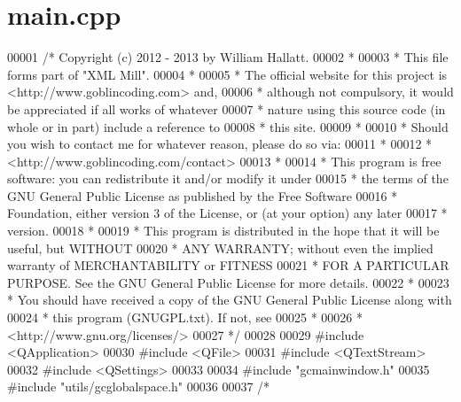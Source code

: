 \hypertarget{main_8cpp_source}{\section{main.\-cpp}
}

\begin{DoxyCode}
00001 \textcolor{comment}{/* Copyright (c) 2012 - 2013 by William Hallatt.}
00002 \textcolor{comment}{ *}
00003 \textcolor{comment}{ * This file forms part of "XML Mill".}
00004 \textcolor{comment}{ *}
00005 \textcolor{comment}{ * The official website for this project is <http://www.goblincoding.com> and,}
00006 \textcolor{comment}{ * although not compulsory, it would be appreciated if all works of whatever}
00007 \textcolor{comment}{ * nature using this source code (in whole or in part) include a reference to}
00008 \textcolor{comment}{ * this site.}
00009 \textcolor{comment}{ *}
00010 \textcolor{comment}{ * Should you wish to contact me for whatever reason, please do so via:}
00011 \textcolor{comment}{ *}
00012 \textcolor{comment}{ *                 <http://www.goblincoding.com/contact>}
00013 \textcolor{comment}{ *}
00014 \textcolor{comment}{ * This program is free software: you can redistribute it and/or modify it
       under}
00015 \textcolor{comment}{ * the terms of the GNU General Public License as published by the Free
       Software}
00016 \textcolor{comment}{ * Foundation, either version 3 of the License, or (at your option) any later}
00017 \textcolor{comment}{ * version.}
00018 \textcolor{comment}{ *}
00019 \textcolor{comment}{ * This program is distributed in the hope that it will be useful, but WITHOUT}
00020 \textcolor{comment}{ * ANY WARRANTY; without even the implied warranty of MERCHANTABILITY or
       FITNESS}
00021 \textcolor{comment}{ * FOR A PARTICULAR PURPOSE.  See the GNU General Public License for more
       details.}
00022 \textcolor{comment}{ *}
00023 \textcolor{comment}{ * You should have received a copy of the GNU General Public License along with}
00024 \textcolor{comment}{ * this program (GNUGPL.txt).  If not, see}
00025 \textcolor{comment}{ *}
00026 \textcolor{comment}{ *                    <http://www.gnu.org/licenses/>}
00027 \textcolor{comment}{ */}
00028 
00029 \textcolor{preprocessor}{#include <QApplication>}
00030 \textcolor{preprocessor}{#include <QFile>}
00031 \textcolor{preprocessor}{#include <QTextStream>}
00032 \textcolor{preprocessor}{#include <QSettings>}
00033 
00034 \textcolor{preprocessor}{#include "gcmainwindow.h"}
00035 \textcolor{preprocessor}{#include "utils/gcglobalspace.h"}
00036 
00037 \textcolor{comment}{/*
}
\end{DoxyCode}
